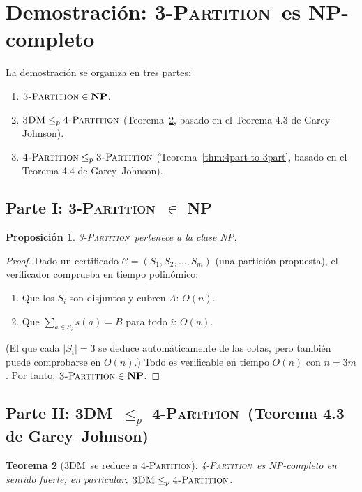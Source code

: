 \documentclass[12pt,a4paper]{article}
\newtheorem{theorem}{Teorema}
\newtheorem{proposition}[theorem]{Proposición}
\theoremstyle{definition}
\theoremstyle{remark}
\newcommand{\TPART}{\textsc{3-Partition}}
\newcommand{\FPART}{\textsc{4-Partition}}
\newcommand{\DM}{\textsc{3DM}}
\begin{document}
\section{Demostración: \TPART\ es NP-completo}

La demostración se organiza en tres partes:
\begin{enumerate}
  \item $\TPART \in \mathbf{NP}$.
  \item $\DM \leq_p \FPART$ (Teorema~\ref{thm:dm-to-4part}, basado en el
        Teorema 4.3 de Garey--Johnson).
  \item $\FPART \leq_p \TPART$ (Teorema~\ref{thm:4part-to-3part}, basado en el
        Teorema 4.4 de Garey--Johnson).
\end{enumerate}

\subsection{Parte I: \TPART\ $\in$ NP}

\begin{proposition}
\TPART\ pertenece a la clase NP.
\end{proposition}

\begin{proof}
Dado un certificado $\mathcal{C} = (S_1, S_2, \ldots, S_m)$
(una partición propuesta), el verificador comprueba en tiempo polinómico:
\begin{enumerate}
  \item Que los $S_i$ son disjuntos y cubren $A$: $O(n)$.
  \item Que $\sum_{a \in S_i} s(a) = B$ para todo $i$: $O(n)$.
\end{enumerate}
(El que cada $|S_i| = 3$ se deduce automáticamente de las cotas, pero también
puede comprobarse en $O(n)$.) Todo es verificable en tiempo $O(n)$ con
$n = 3m$. Por tanto, $\TPART \in \mathbf{NP}$.
\end{proof}

\subsection{Parte II: \DM\ $\leq_p$ \FPART\ (Teorema 4.3 de Garey--Johnson)}

\begin{theorem}[\DM\ se reduce a \FPART]
\label{thm:dm-to-4part}
\FPART\ es NP-completo en sentido fuerte; en particular, $\DM \leq_p \FPART$.
\end{theorem}
\end{document}
